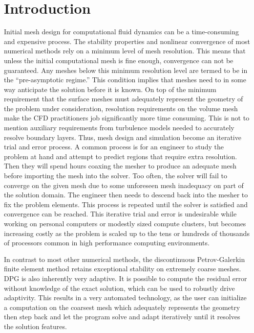 \documentclass[preprint,12pt]{elsarticle}
\begin{document}
\section{Introduction}
Initial mesh design for computational fluid dynamics can be a time-consuming and expensive process. 
The stability properties and nonlinear convergence of most numerical methods rely on a minimum level of mesh resolution. 
This means that unless the initial computational mesh is fine enough, convergence can not be guaranteed. 
Any meshes below this minimum resolution level are termed to be in the ``pre-asymptotic regime.'' 
This condition implies that meshes need to in some way anticipate the solution before it is known. 
On top of the minimum requirement that the surface meshes must adequately represent the geometry of the problem under consideration, 
resolution requirements on the volume mesh make the CFD practitioners job significantly more time consuming. 
This is not to mention auxiliary requirements from turbulence models needed to accurately resolve boundary layers. 
Thus, mesh design and simulation become an iterative trial and error process.
A common process is for an engineer to study the problem at hand and attempt to predict regions that require extra resolution. 
Then they will spend hours coaxing the mesher to produce an adequate mesh before importing the mesh into the solver.
Too often, the solver will fail to converge on the given mesh due to some unforeseen mesh inadequacy on part of the solution domain.
The engineer then needs to descend back into the mesher to fix the problem elements.
This process is repeated until the solver is satisfied and convergence can be reached.
This iterative trial and error is undesirable while working on personal computers or modestly sized compute clusters, 
but becomes increasing costly as the problem is scaled up to the tens or hundreds of thousands of processors common in high performance computing environments.

In contrast to most other numerical methods, the discontinuous Petrov-Galerkin finite element method retains exceptional stability on extremely coarse meshes.
DPG is also inherently very adaptive.
It is possible to compute the residual error without knowledge of the exact solution, which can be used to robustly drive adaptivity.
This results in a very automated technology, as the user can initialize a computation on the coarsest mesh which adequately represents the geometry 
then step back and let the program solve and adapt iteratively until it resolves the solution features.
\end{document}
